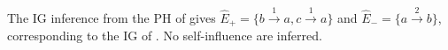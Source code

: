 


\begin{example}
The IG inference from the PH of  gives
$\hat{E}_+ = \{b \xrightarrow{1} a, c \xrightarrow{1} a\}$ and 
$\hat{E}_- = \{a \xrightarrow{2} b\}$, corresponding to the IG of .
No self-influence are inferred. %
\end{example}




\begin{comment}
\subsection{Structure-based Interaction Inference}\label{ssec:infer-IG-structure}

At this point we can divide the set of sorts $\PHs$ into components ($\Gamma$, see \pref{eq:PH-components}) and cooperative sorts
($\PHs \setminus \Gamma$) that will not appear in the IG. 
We define in \pref{eq:ph_predec} the set of predecessors of a sort $a$, that is, the sorts influencing $a$
by considering direct actions and possible intermediate cooperative sorts.
The predecessors of $a$ that are components are the regulators of $a$, denoted $\PHpredecgene{a}$
(\pref{eq:regulators}).
\begin{align}
\begin{split}
\forall a \in \PHs, \PHpredec{a} &\DEF \{b \in \PHs \mid \exists n \in \mathbb{N}^*, \exists
(c^k)_{k \in \segm{0}{n}} \in \PHs^{n+1}, \\
                                   & \quad \quad c^0 = b \wedge c^n = a \\
                                   & \quad \quad \wedge \forall k \in \segm{0}{n-1},
                   c^k \in \PHdirectpredec{c^{k+1}} \cap (\PHs\setminus\Gamma)\}
\end{split}
\label{eq:ph_predec}
\\
\forall a\in \PHs, \PHpredecgene{a} & \DEF \PHpredec{a} \cap \Gamma
\label{eq:regulators}
\end{align}


\end{comment}
